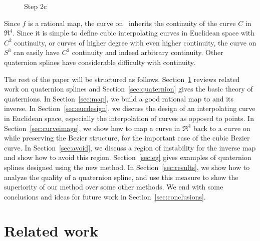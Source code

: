 \begin{figure}
\vspace{2in}
\caption{Step 2c}
\label{fig:alg2c}
\end{figure}

\clearpage
\onecolumn

Since $f$ is a rational map,
the curve on \ inherits the continuity of the curve $C$ in $\Re^4$.
Since it is simple to define cubic interpolating curves
in Euclidean space with $C^2$ continuity, or curves of higher degree with
even higher continuity, the curve on $S^3$ can easily have $C^2$ continuity
and indeed arbitrary continuity.
Other quaternion splines have considerable difficulty with continuity.

The rest of the paper will be structured as follows.
Section~\ref{sec:prevwork} reviews related work on quaternion splines
and Section~\ref{sec:quaternion} gives the basic theory of quaternions.
In Section~\ref{sec:map}, we build a good rational map to  and its inverse.
In Section~\ref{sec:eucdesign},
we discuss the design of an interpolating curve in Euclidean space,
especially the interpolation of curves as opposed to points. 
In Section~\ref{sec:curveimage}, we show how to map a curve in $\Re^4$
back to a curve on  while preserving the Bezier structure,
for the important case of the cubic Bezier curve.
In Section~\ref{sec:avoid}, we discuss a region of instability 
for the inverse map and show how to avoid this region.
Section~\ref{sec:eg} gives examples of quaternion splines designed using the
new method.	
In Section~\ref{sec:results}, we show how to analyze the quality of a 
quaternion spline, and use this measure to show the superiority
of our method over some other methods.
We end with some conclusions and ideas for future work in 
Section~\ref{sec:conclusions}.

\section{Related work}
\label{sec:prevwork}

